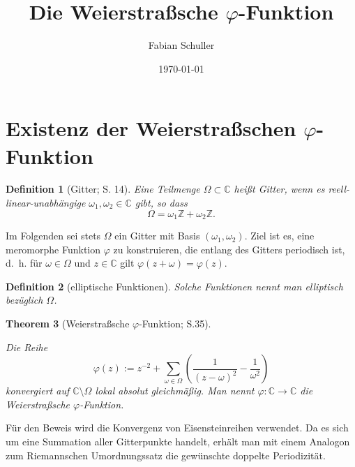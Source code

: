 \documentclass[12pt]{article}
\title{Die Weierstraßsche \(\varphi\)-Funktion}
\author{Fabian Schuller}
\date{\today}
\newtheorem{theorem}{Theorem}[section]
\newtheorem{definition}[theorem]{Definition}
\numberwithin{equation}{section}
\newcommand{\kk}{\cite{kk} }
\begin{document}
\maketitle

\section{\texorpdfstring{Existenz der Weierstraßschen
\(\varphi\)-Funktion}{Existenz der Weierstraßschen \textbackslash varphi-Funktion}}\label{existenz-der-weierstrauxdfschen-varphi-funktion}

\begin{definition}[Gitter; \kk S. 14]

Eine Teilmenge \(\Omega \subset \mathbb C\) heißt Gitter, wenn es
reell-linear-unabhängige \(\omega _1, \omega _2 \in \mathbb C\) gibt, so
dass \begin{equation}{
\Omega = \omega _1 \mathbb Z + \omega _2 \mathbb Z.
}\end{equation}

\end{definition}

Im Folgenden sei stets \(\Omega\) ein Gitter mit Basis
\((\omega _1, \omega _2)\). Ziel ist es, eine meromorphe Funktion
\(\varphi\) zu konstruieren, die entlang des Gitters periodisch ist,
d.~h. für \(\omega \in \Omega\) und \(z \in \mathbb C\) gilt
\(\varphi(z+ \omega )=\varphi(z)\).

\begin{definition}[elliptische Funktionen]

Solche Funktionen nennt man elliptisch bezüglich \(\Omega\).

\end{definition}

\begin{theorem}[Weierstraßsche $\varphi$-Funktion; \kk S.35]\label{thm-weier}

Die Reihe \begin{equation}{
\varphi(z) := z^{-2} + \sum_{\omega \in \Omega} \left(  \frac{1}{(z-\omega )^2} - \frac{1}{\omega ^2} \right)
}\end{equation} konvergiert auf \(\mathbb C \setminus \Omega\) lokal
absolut gleichmäßig. Man nennt \(\varphi : \mathbb C \to \mathbb C\) die
Weierstraßsche \(\varphi\)-Funktion.

\end{theorem}

Für den Beweis wird die Konvergenz von Eisensteinreihen verwendet. Da es
sich um eine Summation aller Gitterpunkte handelt, erhält man mit einem
Analogon zum Riemannschen Umordnungssatz die gewünschte doppelte
Periodizität.
\end{document}
